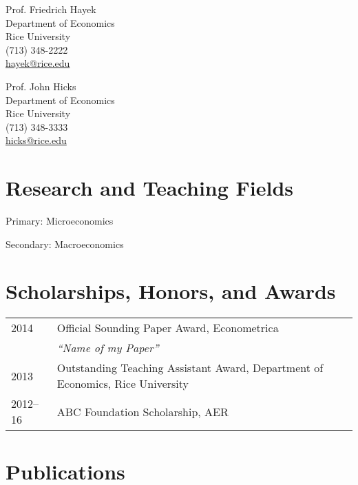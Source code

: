 \documentclass[11pt]{res} %
\begin{document}
\begin{resume}
\begin{minipage}[t]{0.5\textwidth}
Prof. Friedrich Hayek \\
Department of Economics \\
Rice University \\
(713) 348-2222\\
\href{mailto:hayek@rice.edu}{hayek@rice.edu}\\
\end{minipage}%
%
%
%
\begin{minipage}[t]{0.5\textwidth}
Prof. John Hicks \\
Department of Economics\\
Rice University \\
(713) 348-3333 \\
\href{mailto:hicks@rice.edu}{hicks@rice.edu}\\
\end{minipage}


\vspace{-.2cm}
\section{Research and Teaching Fields}
\vspace{6pt}

Primary: Microeconomics \par
Secondary: Macroeconomics

\vspace{-.2cm}
\section{Scholarships, Honors, and Awards}
\vspace{6pt}


\begin{tabular}{l l}
 2014 & Official Sounding Paper Award, Econometrica \\
&\hspace{.5cm} \emph{``Name of my Paper''} \\
 2013 & Outstanding Teaching Assistant Award, Department of Economics, Rice University \\
 2012--16 & ABC Foundation Scholarship, AER
\end{tabular}

\section{Publications}
\vspace{6pt}%


\end{resume}
\end{document}
